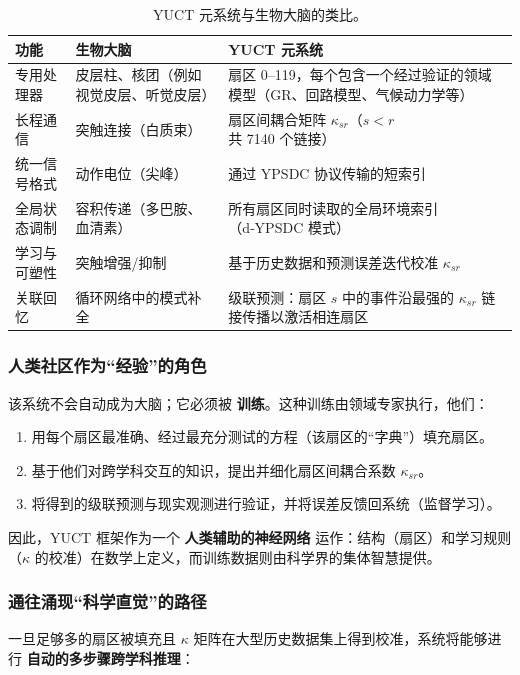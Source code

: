 \documentclass[11pt,a4paper]{article}
\begin{document}
	\begin{table}[htbp]
		\centering
		\caption{YUCT 元系统与生物大脑的类比。}
		\label{tab:brain-analogy}
		\small
		\begin{tabular}{p{3.5cm}p{5.5cm}p{5.5cm}}
			\toprule
			\textbf{功能} & \textbf{生物大脑} & \textbf{YUCT 元系统} \\
			\midrule
			专用处理器 & 皮层柱、核团（例如视觉皮层、听觉皮层） & 扇区 0--119，每个包含一个经过验证的领域模型（GR、回路模型、气候动力学等） \\
			长程通信 & 突触连接（白质束） & 扇区间耦合矩阵 $\kappa_{sr}$（$s<r$ 共 7140 个链接） \\
			统一信号格式 & 动作电位（尖峰） & 通过 YPSDC 协议传输的短索引 \\
			全局状态调制 & 容积传递（多巴胺、血清素） & 所有扇区同时读取的全局环境索引（d‑YPSDC 模式） \\
			学习与可塑性 & 突触增强/抑制 & 基于历史数据和预测误差迭代校准 $\kappa_{sr}$ \\
			关联回忆 & 循环网络中的模式补全 & 级联预测：扇区 $s$ 中的事件沿最强的 $\kappa_{sr}$ 链接传播以激活相连扇区 \\
			\bottomrule
		\end{tabular}
	\end{table}
	
	\subsubsection*{人类社区作为“经验”的角色}
	该系统不会自动成为大脑；它必须被 \textbf{训练}。这种训练由领域专家执行，他们：
	\begin{enumerate}[leftmargin=*]
		\item 用每个扇区最准确、经过最充分测试的方程（该扇区的“字典”）填充扇区。
		\item 基于他们对跨学科交互的知识，提出并细化扇区间耦合系数 $\kappa_{sr}$。
		\item 将得到的级联预测与现实观测进行验证，并将误差反馈回系统（监督学习）。
	\end{enumerate}
	因此，YUCT 框架作为一个 \textbf{人类辅助的神经网络} 运作：结构（扇区）和学习规则（$\kappa$ 的校准）在数学上定义，而训练数据则由科学界的集体智慧提供。
	
	\subsubsection*{通往涌现“科学直觉”的路径}
	一旦足够多的扇区被填充且 $\kappa$ 矩阵在大型历史数据集上得到校准，系统将能够进行 \textbf{自动的多步骤跨学科推理}：
	
\end{document}
